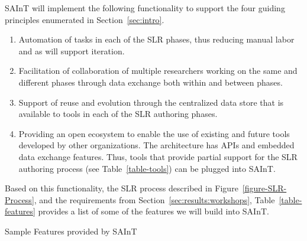 SAInT will implement the following functionality to support the four guiding principles enumerated in Section~\ref{sec:intro}.
\begin{enumerate}
	\item Automation of tasks in each of the SLR phases, thus reducing manual labor and as will support iteration.  
	\item Facilitation of collaboration of multiple researchers working on the same and different phases through data exchange both within and between phases. 
	\item Support of reuse and evolution through the centralized data store that is available to tools in each of the SLR authoring phases.  
	\item Providing an open ecosystem to enable the use of existing and future tools developed by other organizations. The architecture has APIs and embedded data exchange features. Thus, tools that provide partial support for the SLR authoring process (see Table~\ref{table-tools}) can be plugged into SAInT. 
\end{enumerate}

Based on this functionality, the SLR process described in Figure~\ref{figure-SLR-Process}, and the requirements from Section~\ref{sec:results:workshops}, Table~\ref{table-features} provides a list of some of the features we will build into SAInT.  


\begin{table}
	\centering
	\caption{Sample Features provided by SAInT}
	
	\label{table-features}
\end{table}

